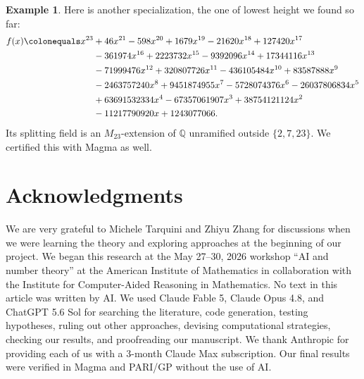 \documentclass[12pt,reqno]{amsart}
\newcommand{\Q}{\mathbb{Q}}
\theoremstyle{definition}
\newtheorem{example}[theorem]{Example}
\theoremstyle{remark}
\begin{document}
\begin{example}
\label{Ex:M23 over Q again}
Here is another specialization, the one of lowest height we found so far:
\begin{align*} 
f(x) \colonequals x^{23} &+ 46 x^{21} - 598 x^{20} + 1679 x^{19} - 21620 x^{18} + 127420 x^{17}\\ 
&- 361974 x^{16} + 2223732 x^{15} - 9392096 x^{14} + 17344116 x^{13}\\ 
&-71999476 x^{12} + 320807726 x^{11} - 436105484 x^{10} + 83587888 x^9\\ 
&-2463757240 x^8 + 9451874955 x^7 - 5728074376 x^6 - 26037806834 x^5\\ 
&+63691532334 x^4 - 67357061907 x^3 + 38754121124 x^2\\ 
&-11217790920 x + 1243077066. 
\end{align*}
Its splitting field is an $M_{23}$-extension of $\Q$ unramified outside $\{2,7,23\}$.
We certified this with Magma as well.
\end{example}


\section*{Acknowledgments} 

We are very grateful to Michele Tarquini and Zhiyu Zhang for discussions when we were learning the theory and exploring approaches at the beginning of our project.
We began this research at the May 27--30, 2026 workshop ``AI and number theory'' at the American Institute of Mathematics in collaboration with the Institute for Computer-Aided Reasoning in Mathematics.
No text in this article was written by AI.
We used Claude Fable 5, Claude Opus 4.8, and ChatGPT 5.6 Sol for searching the literature, code generation, testing hypotheses, ruling out other approaches, devising computational strategies, checking our results, and proofreading our manuscript.
We thank Anthropic for providing each of us with a 3-month Claude Max subscription.
Our final results were verified in Magma and PARI/GP without the use of AI.



\end{document}
